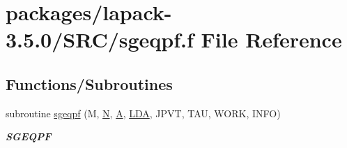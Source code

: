 \hypertarget{sgeqpf_8f}{}\section{packages/lapack-\/3.5.0/\+S\+R\+C/sgeqpf.f File Reference}
\label{sgeqpf_8f}
\subsection*{Functions/\+Subroutines}
\begin{DoxyCompactItemize}
\item 
subroutine \hyperlink{group__realGEcomputational_gac3876ee65cc8a4a6130d8f1aa9117931}{sgeqpf} (M, \hyperlink{polmisc_8c_a0240ac851181b84ac374872dc5434ee4}{N}, \hyperlink{classA}{A}, \hyperlink{example__user_8c_ae946da542ce0db94dced19b2ecefd1aa}{L\+D\+A}, J\+P\+V\+T, T\+A\+U, W\+O\+R\+K, I\+N\+F\+O)
\begin{DoxyCompactList}\small\item\em {\bfseries S\+G\+E\+Q\+P\+F} \end{DoxyCompactList}\end{DoxyCompactItemize}
